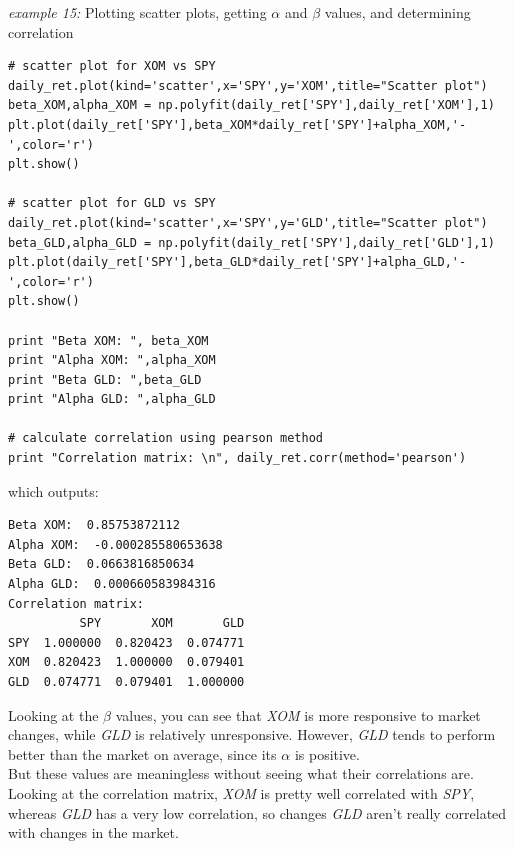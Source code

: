 \noindent\begin{minipage}{\linewidth}
\noindent\textit{example 15:} Plotting scatter plots, getting $\alpha$ and $\beta$ values, and determining correlation
\begin{lstlisting}[style=python]
# scatter plot for XOM vs SPY
daily_ret.plot(kind='scatter',x='SPY',y='XOM',title="Scatter plot")
beta_XOM,alpha_XOM = np.polyfit(daily_ret['SPY'],daily_ret['XOM'],1)
plt.plot(daily_ret['SPY'],beta_XOM*daily_ret['SPY']+alpha_XOM,'-',color='r')
plt.show()

# scatter plot for GLD vs SPY
daily_ret.plot(kind='scatter',x='SPY',y='GLD',title="Scatter plot")
beta_GLD,alpha_GLD = np.polyfit(daily_ret['SPY'],daily_ret['GLD'],1)
plt.plot(daily_ret['SPY'],beta_GLD*daily_ret['SPY']+alpha_GLD,'-',color='r')
plt.show()

print "Beta XOM: ", beta_XOM
print "Alpha XOM: ",alpha_XOM
print "Beta GLD: ",beta_GLD
print "Alpha GLD: ",alpha_GLD

# calculate correlation using pearson method
print "Correlation matrix: \n", daily_ret.corr(method='pearson')
\end{lstlisting}
\end{minipage}
\noindent which outputs:
\begin{lstlisting}[style=python]
Beta XOM:  0.85753872112
Alpha XOM:  -0.000285580653638
Beta GLD:  0.0663816850634
Alpha GLD:  0.000660583984316
Correlation matrix: 
          SPY       XOM       GLD
SPY  1.000000  0.820423  0.074771
XOM  0.820423  1.000000  0.079401
GLD  0.074771  0.079401  1.000000
\end{lstlisting}

\noindent Looking at the $\beta$ values, you can see that \textit{XOM} is more responsive to market changes, while \textit{GLD} is relatively unresponsive. However, \textit{GLD} tends to perform better than the market on average, since its $\alpha$ is positive.\\

\noindent But these values are meaningless without seeing what their correlations are. Looking at the correlation matrix, \textit{XOM} is pretty well correlated with \textit{SPY}, whereas \textit{GLD} has a very low correlation, so changes \textit{GLD} aren't really correlated with changes in the market.

